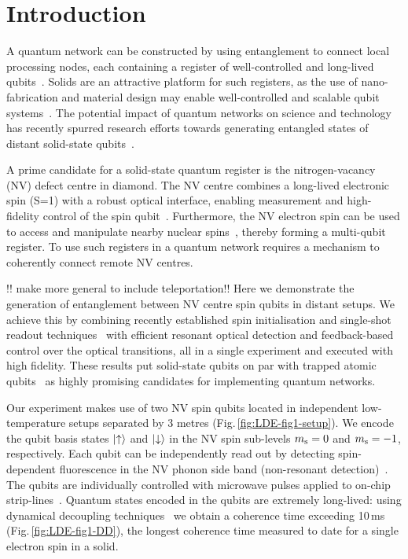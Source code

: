 \clearpage

\section{Introduction}

A quantum network can be constructed by using entanglement to connect local processing nodes, each containing a register of well-controlled and long-lived qubits~\cite{Kimble2008}. Solids are an attractive platform for such registers, as the use of nano-fabrication and material design may enable well-controlled and scalable qubit systems~\cite{Ladd2010}. The potential impact of quantum networks on science and technology has recently spurred research efforts towards generating entangled states of distant solid-state qubits~\cite{Togan2010,Gao2012,DeGreve2012,Bernien2012a,Sipahigil2012,Patel2010,Flagg2010}.

A prime candidate for a solid-state quantum register is the nitrogen-vacancy (NV) defect centre in diamond. The NV centre combines a long-lived electronic spin (S=1) with a robust optical interface, enabling measurement and high-fidelity control of the spin qubit~\cite{Togan2010,Fuchs2009,DeLange2010,VanderSar2012}. Furthermore, the NV electron spin can be used to access and manipulate nearby nuclear spins~\cite{Robledo2011,Neumann2010a,Neumann2008,Maurer2012,Pfaff2012}, thereby forming a multi-qubit register. To use such registers in a quantum network requires a mechanism to coherently connect remote NV centres.

!! make more general to include teleportation!! Here we demonstrate the generation of entanglement between NV centre spin qubits in distant setups. We achieve this by combining recently established spin initialisation and single-shot readout techniques~\cite{Robledo2011} with efficient resonant optical detection and feedback-based control over the optical transitions, all in a single experiment and executed with high fidelity. These results put solid-state qubits on par with trapped atomic qubits~\cite{Moehring2007,Ritter2012,Hofmann2012} as highly promising candidates for implementing quantum networks.

Our experiment makes use of two NV spin qubits located in independent low-temperature setups separated by 3 metres (Fig.\,\ref{fig:LDE-fig1-setup}). We encode the qubit basis states $\left|\uparrow\right\rangle$ and $\left|\downarrow\right\rangle$ in the NV spin sub-levels $m_\mathrm s = 0$ and $m_\mathrm s = -1$, respectively. Each qubit can be independently read out by detecting spin-dependent fluorescence in the NV phonon side band (non-resonant detection)~\cite{Robledo2011}. The qubits are individually controlled with microwave pulses applied to on-chip strip-lines~\cite{DeLange2010}. Quantum states encoded in the qubits are extremely long-lived: using dynamical decoupling techniques~\cite{DeLange2010} we obtain a coherence time exceeding 10$\,$ms (Fig.\,\ref{fig:LDE-fig1-DD}), the longest coherence time measured to date for a single electron spin in a solid.

